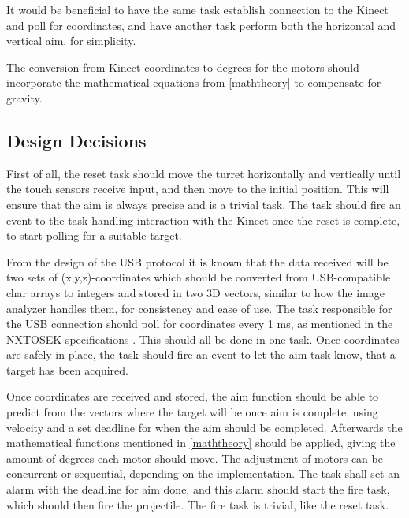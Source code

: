 It would be beneficial to have the same task establish connection to the Kinect and poll for coordinates, and have another task perform both the horizontal and vertical aim, for simplicity.

The conversion from Kinect coordinates to degrees for the motors should incorporate the mathematical equations from \autoref{maththeory} to compensate for gravity.

\subsection{Design Decisions}
First of all, the reset task should move the turret horizontally and vertically until the touch sensors receive input, and then move to the initial position. This will ensure that the aim is always precise and is a trivial task. The task should fire an event to the task handling interaction with the Kinect once the reset is complete, to start polling for a suitable target.

From the design of the USB protocol it is known that the data received will be two sets of (x,y,z)-coordinates which should be converted from USB-compatible char arrays to integers and stored in two 3D vectors, similar to how the image analyzer handles them, for consistency and ease of use. The task responsible for the USB connection should poll for coordinates every 1 ms, as mentioned in the NXTOSEK specifications \cite{osek_spec}. This should all be done in one task. Once coordinates are safely in place, the task should fire an event to let the aim-task know, that a target has been acquired.

Once coordinates are received and stored, the aim function should be able to predict from the vectors where the target will be once aim is complete, using velocity and a set deadline for when the aim should be completed. Afterwards the mathematical functions mentioned in \autoref{maththeory} should be applied, giving the amount of degrees each motor should move. The adjustment of motors can be concurrent or sequential, depending on the implementation. The task shall set an alarm with the deadline for aim done, and this alarm should start the fire task, which should then fire the projectile. The fire task is trivial, like the reset task.

